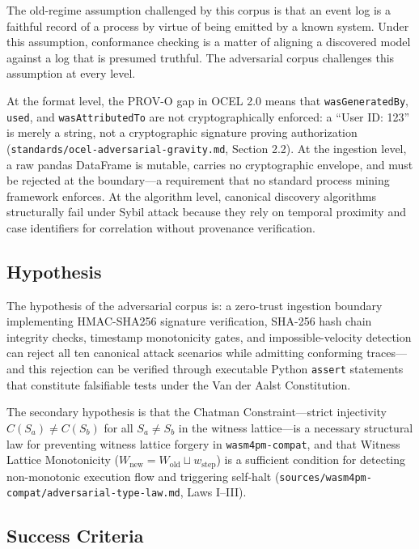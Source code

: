 The old-regime assumption challenged by this corpus is that an event log is a faithful record
of a process by virtue of being emitted by a known system. Under this assumption, conformance
checking is a matter of aligning a discovered model against a log that is presumed truthful.
The adversarial corpus challenges this assumption at every level.

At the format level, the PROV-O gap in OCEL 2.0 means that \texttt{wasGeneratedBy},
\texttt{used}, and \texttt{wasAttributedTo} are not cryptographically enforced: a ``User ID:
123'' is merely a string, not a cryptographic signature proving authorization
(\texttt{standards/ocel-adversarial-gravity.md}, Section 2.2). At the ingestion level, a raw
pandas DataFrame is mutable, carries no cryptographic envelope, and must be rejected at the
boundary---a requirement that no standard process mining framework enforces. At the algorithm
level, canonical discovery algorithms structurally fail under Sybil attack because they rely
on temporal proximity and case identifiers for correlation without provenance verification.

\subsection{Hypothesis}
\label{sec:adversarial-question-hypothesis}

The hypothesis of the adversarial corpus is: a zero-trust ingestion boundary implementing
HMAC-SHA256 signature verification, SHA-256 hash chain integrity checks, timestamp
monotonicity gates, and impossible-velocity detection can reject all ten canonical attack
scenarios while admitting conforming traces---and this rejection can be verified through
executable Python \texttt{assert} statements that constitute falsifiable tests under the Van
der Aalst Constitution.

The secondary hypothesis is that the Chatman Constraint---strict injectivity $C(S_a) \neq
C(S_b)$ for all $S_a \neq S_b$ in the witness lattice---is a necessary structural law for
preventing witness lattice forgery in \texttt{wasm4pm-compat}, and that Witness Lattice
Monotonicity ($W_{\text{new}} = W_{\text{old}} \sqcup w_{\text{step}}$) is a sufficient
condition for detecting non-monotonic execution flow and triggering self-halt
(\texttt{sources/wasm4pm-compat/adversarial-type-law.md}, Laws I--III).

\subsection{Success Criteria}
\label{sec:adversarial-question-success}

